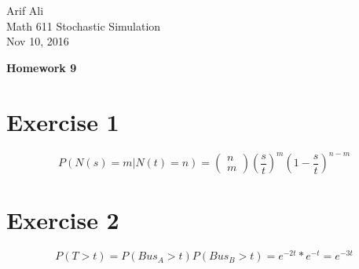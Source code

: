 \documentclass{article}\usepackage[]{graphicx}\usepackage[]{color}
\begin{document}
\begin{flushright}
Arif Ali\\
Math 611 Stochastic Simulation\\
Nov 10, 2016\\
\end{flushright}

\begin{center}
\LARGE\textbf{Homework 9}
  \end{center}
\section*{Exercise 1}
\begin{equation}
P(N(s)=m|N(t)=n)=\left(\begin{array}{c}
n\\
m
\end{array}\right)\left(\frac{s}{t}\right)^{m}\left(1-\frac{s}{t}\right)^{n-m}
\end{equation}
\section*{Exercise 2}
\begin{equation}
P(T>t)=P(Bus_{A}>t)P(Bus_{B}>t)=e^{-2t}*e^{-t}=e^{-3t}
\end{equation}
\end{document}
